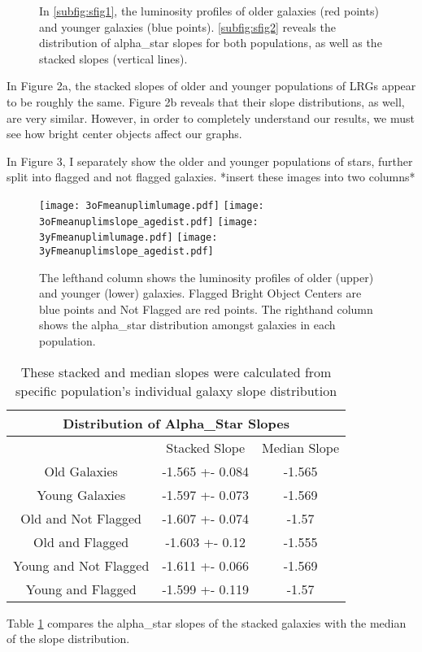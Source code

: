 \documentclass{article}
\begin{document}
\begin{figure}[h!]
\hfill
{}
 \caption{In \ref{subfig:sfig1}, the luminosity profiles of older galaxies (red points) and younger galaxies (blue points). \ref{subfig:sfig2} reveals the distribution of alpha\_star slopes for both populations, as well as the stacked slopes (vertical lines).}
\label{fig:mesh2}
\end{figure}


In Figure 2a, the stacked slopes of older and younger populations of LRGs appear to be roughly the same. Figure 2b reveals that their slope distributions, as well, are very similar.  However, in order to completely understand our results, we must see how bright center objects affect our graphs.

In Figure 3, I separately show the older and younger populations of stars, further split into flagged and not flagged galaxies. *insert these images into two columns*

\begin{figure*}[t]
\texttt{[image: 3oFmeanuplimlumage.pdf]}
\label{subfig:sfig3}
\texttt{[image: 3oFmeanuplimslope\_agedist.pdf]}
\label{subfig:sfig4}
\texttt{[image: 3yFmeanuplimlumage.pdf]}
\label{subfig:sfig5}
\texttt{[image: 3yFmeanuplimslope\_agedist.pdf]}
\label{subfig:sfig6}
\caption{The left\-hand column shows the luminosity profiles of older (upper) and younger (lower) galaxies. Flagged Bright Object Centers are blue points and Not Flagged are red points. The right\-hand column shows the alpha\_star distribution amongst galaxies in each population.}
\label{fig:mesh3}
\end{figure*}


\begin{table}[h]
\centering
\begin{tabular}{ ||c|c|c|| }
\hline
\multicolumn{3}{||c||}{Distribution of Alpha\_Star Slopes}\\
\hline\hline
   & Stacked Slope & Median Slope \\
\hline
Old Galaxies & -1.565 +- 0.084 &-1.565 \\
\hline
Young Galaxies &-1.597 +- 0.073 & -1.569\\
\hline
Old and Not Flagged & -1.607 +- 0.074 & -1.57\\
\hline
Old and Flagged & -1.603 +- 0.12 & -1.555\\
\hline
Young and Not Flagged & -1.611 +- 0.066 & -1.569\\
\hline
Young and Flagged & -1.599 +- 0.119 & -1.57\\
\hline
\end{tabular}
\caption{These stacked and median slopes were calculated from specific population's individual galaxy slope distribution}
\label{table:2}
\end{table}

Table \ref{table:2} compares the alpha\_star slopes of the stacked galaxies with the median of the slope distribution. 
\end{document}
